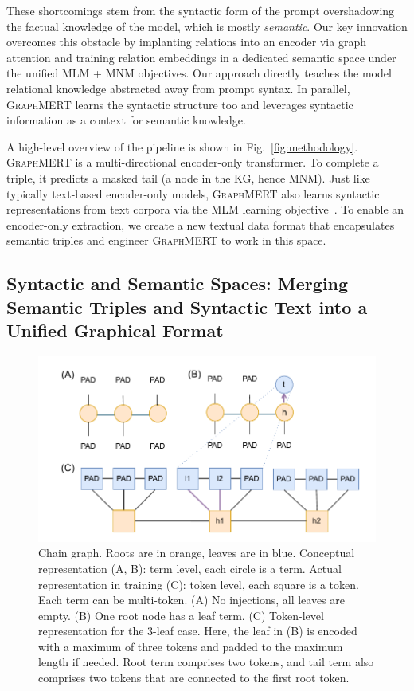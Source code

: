 \documentclass[10pt]{article}
\newcommand{\ours}{\textsc{GraphMERT}\xspace}
\begin{document}
These shortcomings stem from the syntactic form of the prompt overshadowing the factual knowledge of the model, which is mostly \emph{semantic}. Our key innovation overcomes this obstacle by implanting relations into an encoder via graph attention and training relation embeddings in a dedicated semantic space under the unified MLM + MNM objectives. Our approach directly teaches the model relational knowledge abstracted away from prompt syntax. In parallel, \ours learns the syntactic structure too and leverages syntactic information as a context for semantic knowledge.

A high-level overview of the pipeline is shown in Fig.~\ref{fig:methodology}. \ours is a multi-directional encoder-only transformer. To complete a triple, it predicts a masked tail (a node in the KG, hence MNM). Just like typically text-based encoder-only models, \ours also learns syntactic representations from text corpora via the MLM learning objective~\cite{devlin2019bert}. To enable an encoder-only extraction, we create a new textual data format that encapsulates semantic triples and engineer \ours to work in this space.

\subsection{Syntactic and Semantic Spaces: Merging Semantic Triples and Syntactic Text into a Unified Graphical Format}
\label{subsec:syntactic_semantic_spaces}

\begin{figure}[t]
\centering
\includegraphics[width=0.6\linewidth]{pictures/connectivity.pdf}
\caption{Chain graph. Roots are in orange, leaves are in blue. Conceptual representation (A, B): term level, each circle is a term. Actual representation in training (C): token level, each square is a token. Each term can be multi-token. (A) No injections, all leaves are empty. (B) One root node has a leaf term. (C) Token-level representation for the 3-leaf case. Here, the leaf in (B) is encoded with a maximum of three tokens and padded to the maximum length if needed. Root term comprises two tokens, and tail term also comprises two tokens that are connected to the first root token.}
\label{fig:connectivity}
\end{figure}
\end{document}
